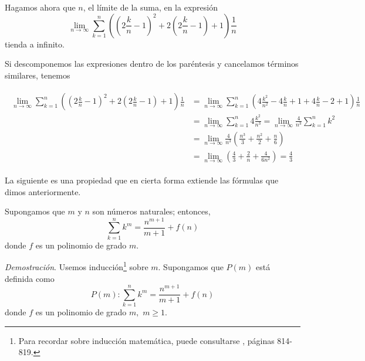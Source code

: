 \begin{ejemplo}
  Hagamos ahora que $n$, el límite de la suma, en la expresión
  \[
    \lim_{n\to\infty}\sum_{k=1}^{n}\left( \left(
    2\frac{k}{n}-1\right) ^{2}+2\left( 2\frac{k}{n}-1\right) +1\right) \frac{1}{n}
  \]
  tienda a infinito.
\end{ejemplo}
Si descomponemos las expresiones dentro de los paréntesis y cancelamos términos similares, tenemos

\begin{gather*}
  \begin{aligned}
    \lim_{n\to\infty}\sum_{k=1}^{n}\left( \left( 2\frac{k}{n}-1\right) ^{2}+2\left( 2\frac{k}{n}-1\right) +1\right) \frac{1}{n}
    &= \lim_{n\to\infty}\sum_{k=1}^{n}\left( 4\frac{k^{2}}{n^{2}}-4\frac{k}{n}+1+4\frac{k}{n}-2+1\right) \frac{1}{n}\\
    &= \lim_{n\to\infty}\sum_{k=1}^{n}4\frac{k^{2}}{n^{3}} = \lim_{n\to\infty}\frac{4}{n^{3}}\sum_{k=1}^{n}k^{2}\\
    &= \lim_{n\to\infty}\frac{4}{n^{3}}\left( \frac{n^{3}}{3}+\frac{n^{2}}{2}+\frac{n}{6}\right)\\
    &= \underset{n\rightarrow \infty}{\lim}\left(\frac{4}{3}+\frac{2}{n}+\frac{4}{6n^{2}}\right)=\frac{4}{3}
  \end{aligned}
\end{gather*}

La siguiente es una propiedad que en cierta forma extiende las fórmulas que dimos anteriormente.

\begin{teorema}\label{SumPotenDeK}
  Supongamos que $m$ y $n$ son números naturales; entonces,
  \[
    \sum_{k=1}^{n}k^{m}=\frac{n^{m+1}}{m+1}+f\left( n\right)
  \]
  donde $f$ es un polinomio de grado $m$.
\end{teorema}

\textit{Demostración}. Usemos inducción\footnote{Para recordar sobre inducción matemática, puede consultarse \textcite{Stewart_2012}, páginas 814-819.} sobre $m$.
Supongamos que $P\left( m\right)$ está definida como
\begin{equation*}
  P\left( m\right):\sum_{k=1}^{n}k^{m}=\frac{n^{m+1}}{m+1}+f\left( n\right)
\end{equation*}
donde $f$ es un polinomio de grado $m,$ $m\geq 1$.

